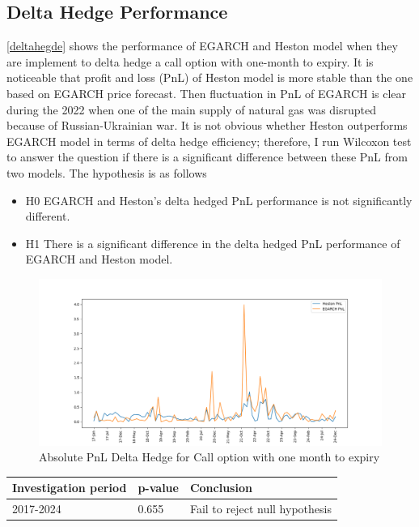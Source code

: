 \documentclass[12pt,a4paper]{article}
\newcommand\colorAutoref[1]{{\hypersetup{linkcolor=black}\autoref{#1}}}
\numberwithin{equation}{section}
\begin{document}
\subsection{Delta Hedge Performance}


\colorAutoref{deltahegde} shows the performance of EGARCH and Heston model when they are implement to delta hedge a call option with one-month to expiry. It is noticeable that profit and loss (PnL) of Heston model is more stable than the one based on EGARCH price forecast. Then fluctuation in PnL of EGARCH is clear during the 2022 when one of the main supply of natural gas was disrupted because of Russian-Ukrainian war. It is not obvious whether Heston outperforms EGARCH model in terms of delta hedge efficiency; therefore, I run Wilcoxon test to answer the question if there is a significant difference between these PnL from two models. The hypothesis is as follows

\begin{itemize}
\item H0 EGARCH and Heston's delta hedged PnL performance is not significantly different.
\item H1 There is a significant difference in the delta hedged PnL performance of EGARCH and Heston model.
\end{itemize}



\begin{figure}[h!] 
\includegraphics[scale=1,width=1\linewidth,height=0.4\textheight]{deltahedge_pnl.png}
\caption{Absolute PnL Delta Hedge for Call option with one month to expiry}
\label{deltahegde}
\end{figure}

\begin{table}[h!]
\centering
\begin{tabular}{@{}lll@{}}
\toprule
Investigation period     & p-value & Conclusion                     \\ \midrule
2017-2024                & 0.655    & Fail to reject null hypothesis \\ \bottomrule
\end{tabular}
\end{table}
\end{document}
